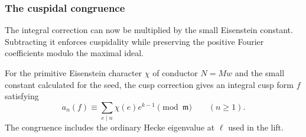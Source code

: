 \subsubsection{The cuspidal congruence}

The integral correction can now be multiplied by the small Eisenstein constant. Subtracting it enforces cuspidality while preserving the positive Fourier coefficients modulo the maximal ideal.

\begin{proposition}\label{prop:count-three-cusp-congruence}
For the primitive Eisenstein character \(\chi\) of conductor \(N=Mw\)
and the small constant calculated for the seed, the cusp correction gives an integral cusp form \(f\) satisfying 
\[
 a_n(f)\equiv\sum_{e\mid n}\chi(e)e^{k-1}\pmod{\mathfrak m}\qquad(n\ge1).
\]
 The
congruence includes the ordinary Hecke eigenvalue at \(\ell\)
used in the lift.
\end{proposition}

